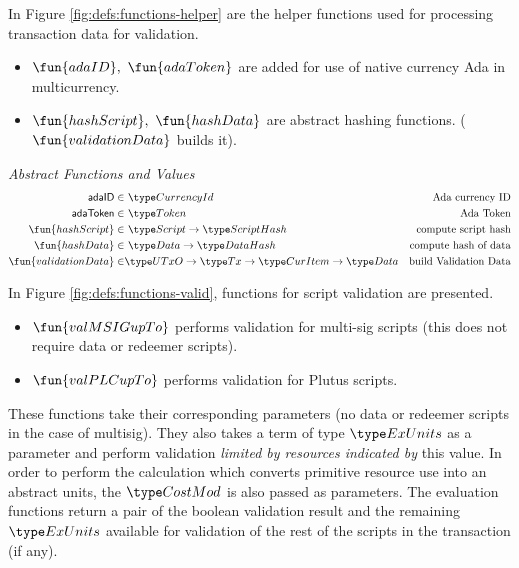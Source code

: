 In Figure \ref{fig:defs:functions-helper} are the helper functions used for
processing transaction data for validation.

\begin{itemize}
  \item $\fun{adaID},~\fun{adaToken}$ are
  added for use of native currency Ada in multicurrency.
  \item $\fun{hashScript},~ \fun{hashData}$ are abstract hashing functions.
  ($\fun{validationData}$ builds it).
\end{itemize}

\begin{figure*}[htb]
  \emph{Abstract Functions and Values}
  \begin{align*}
    \mathsf{adaID} \in& ~\CurrencyId
    & \text{Ada currency ID} \\
    \mathsf{adaToken} \in& ~\Token
    & \text{Ada Token} \\
    \fun{hashScript} \in & ~\Script\to \HashScr
    & \text{compute script hash} \\
    \fun{hashData} \in & ~\Data \to \HashDat
    & \text{compute hash of data} \\
    \fun{validationData} \in & \UTxO \to \Tx \to \CurItem \to \Data
    & \text{build Validation Data} \\
  \end{align*}
  \caption{Script Validation}
  \label{fig:defs:functions-helper}
\end{figure*}


In Figure \ref{fig:defs:functions-valid}, functions for script validation
are presented.

\begin{itemize}
  \item $\fun{valMSIGupTo}$ performs validation for multi-sig scripts
  (this does not require data or redeemer scripts).
  \item $\fun{valPLCupTo}$ performs validation for Plutus scripts.
\end{itemize}

These functions take their corresponding parameters (no data or redeemer
scripts in the case of multisig). They also
takes a term of type $\ExUnits$ as a parameter and perform validation
\textit{limited by resources indicated by} this value.
In order to perform the calculation which converts primitive resource use into an
abstract units, the $\CostMod$ is also passed as parameters.
The evaluation functions return a pair
of the boolean validation result and the remaining $\ExUnits$ available
for validation of the rest of the scripts in the transaction (if any).

